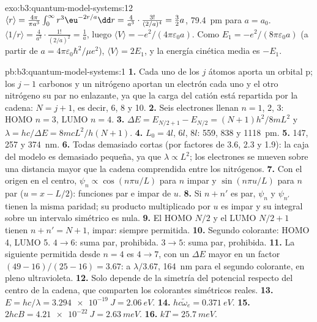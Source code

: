 \begin{solution}{exo:b3:quantum-model-systems:12}
$\langle r\rangle = \frac{4\pi}{\pi a^3}\int_0^\infty r^3\eu^{-2r/a}\dd r =
\frac{4}{a^3}\cdot\frac{3!}{(2/a)^4} = \frac32a$, \qty{79.4}{pm} para $a = a_0$.
$\langle 1/r\rangle = \frac{4}{a^3}\cdot\frac{1!}{(2/a)^2} = \frac1a$, luego
$\langle V\rangle = -e^2/(4\pi\varepsilon_0a)$. Como $E_1 =
-e^2/(8\pi\varepsilon_0a)$ (a partir de $a = 4\pi\varepsilon_0\hbar^2/\mu e^2$),
$\langle V\rangle = 2E_1$, y la energía cinética media es $-E_1$.
\end{solution}

\begin{solution}{pb:b3:quantum-model-systems:1}
\textbf{1.} Cada uno de los $j$ átomos aporta un orbital p; los $j - 1$ carbonos y
un nitrógeno aportan un electrón cada uno y el otro nitrógeno su par no enlazante,
ya que la carga del catión está repartida por la cadena: $N = j + 1$, es decir, 6,
8 y 10.
\textbf{2.} Seis electrones llenan $n = 1$, 2, 3: HOMO $n = 3$, LUMO $n = 4$.
\textbf{3.} $\Delta E = E_{N/2+1} - E_{N/2} = (N+1)h^2/8mL^2$ y $\lambda =
hc/\Delta E = 8mcL^2/h(N+1)$.
\textbf{4.} $L_0 = 4l$, $6l$, $8l$: 559, 838 y \qty{1118}{pm}.
\textbf{5.} 147, 257 y \qty{374}{nm}.
\textbf{6.} Todas demasiado cortas (por factores de 3.6, 2.3 y 1.9): la caja del modelo es demasiado
pequeña, ya que $\lambda \propto L^2$; los electrones se mueven sobre una distancia
mayor que la cadena comprendida entre los nitrógenos.
\textbf{7.} Con el origen en el centro, $\psi_n \propto \cos(n\pi u/L)$ para
$n$ impar y $\sin(n\pi u/L)$ para $n$ par ($u = x - L/2$): funciones par e impar
de $u$.
\textbf{8.} Si $n + n'$ es par, $\psi_n$ y $\psi_{n'}$ tienen la misma paridad;
su producto multiplicado por $u$ es impar y su integral sobre un intervalo simétrico
es nula.
\textbf{9.} El HOMO $N/2$ y el LUMO $N/2 + 1$ tienen $n + n' = N + 1$, impar: siempre
permitida.
\textbf{10.} Segundo colorante: HOMO 4, LUMO 5. $4 \to 6$: suma par, prohibida.
$3 \to 5$: suma par, prohibida.
\textbf{11.} La siguiente permitida desde $n = 4$ es $4 \to 7$, con un
$\Delta E$ mayor en un factor $(49 - 16)/(25 - 16) = 3.67$: a $\lambda/3.67$,
\qty{164}{nm} para el segundo colorante, en pleno ultravioleta.
\textbf{12.} Solo depende de la simetría del potencial respecto del centro de la
cadena, que comparten los colorantes simétricos reales.
\textbf{13.} $E = hc/\lambda = \qty{3.294e-19}{J} = \qty{2.06}{eV}$.
\textbf{14.} $hc\tilde\omega_e = \qty{0.371}{eV}$.
\textbf{15.} $2hcB = \qty{4.21e-22}{J} = \qty{2.63}{meV}$.
\textbf{16.} $kT = \qty{25.7}{meV}$.

\end{solution}
